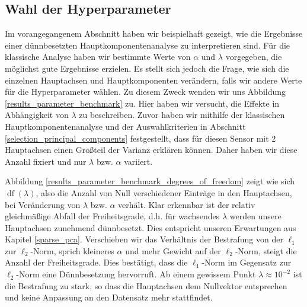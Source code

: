 

\subsection{Wahl der Hyperparameter}

Im vorangegangenem Abschnitt haben wir beispielhaft gezeigt, wie die Ergebnisse einer dünnbesetzten Hauptkomponentenanalyse zu interpretieren sind. Für die klassische Analyse haben wir bestimmte Werte von $\alpha$ und $\lambda$ vorgegeben, die möglichst gute Ergebnisse erzielen. Es stellt sich jedoch die Frage, wie sich die einzelnen Hauptachsen und Hauptkomponenten verändern, falls wir andere Werte für die Hyperparameter wählen. Zu diesem Zweck wenden wir uns Abbildung \ref{results_parameter_benchmark} zu. Hier haben wir versucht, die Effekte in Abhängigkeit von $\lambda$ zu beschreiben. Zuvor haben wir mithilfe der klassischen Hauptkomponentenanalyse und der Auswahlkriterien in Abschnitt \ref{selection_principal_components} festgestellt, dass für diesen Sensor mit $2$ Hauptachsen einen Großteil der Varianz erklären können. Daher haben wir diese Anzahl fixiert und nur $\lambda$ bzw. $\alpha$ variiert. 

Abbildung \ref{results_parameter_benchmark_degrees_of_freedom} zeigt wie sich $\operatorname{df}(\lambda)$, also die Anzahl von Null verschiedener Einträge in den Hauptachsen, bei Veränderung von $\lambda$ bzw. $\alpha$ verhält. Klar erkennbar ist der relativ gleichmäßige Abfall der Freiheitsgrade, d.h. für wachsendes $\lambda$ werden unsere Hauptachsen zunehmend dünnbesetzt. Dies entspricht unseren Erwartungen aus Kapitel \ref{sparse_pca}. Verschieben wir das Verhältnis der Bestrafung von der $\ell_1$ zur $\ell_2$-Norm, sprich kleineres $\alpha$ und mehr Gewicht auf der $\ell_2$-Norm, steigt die Anzahl der Freiheitsgrade. Dies bestätigt, dass die $\ell_1$-Norm im Gegensatz zur $\ell_2$-Norm eine Dünnbesetzung hervorruft. Ab einem gewissem Punkt $\lambda \approx 10^{-2}$ ist die Bestrafung zu stark, so dass die Hauptachsen dem Nullvektor entsprechen und keine Anpassung an den Datensatz mehr stattfindet.

